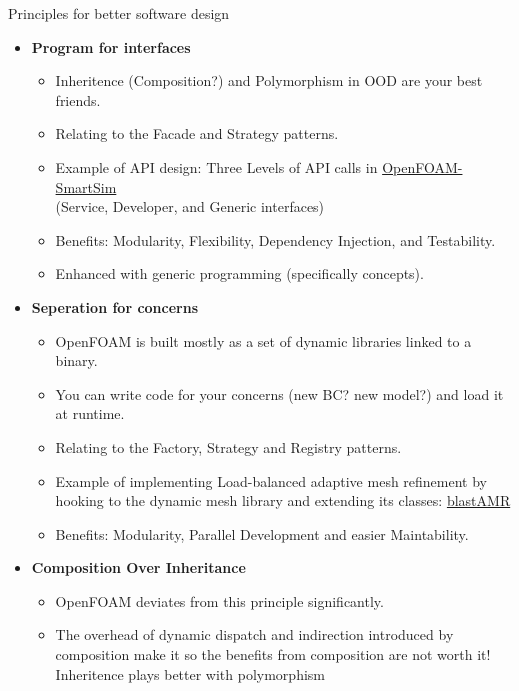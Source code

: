 \begin{frame}{Principles for better software design}

\begin{itemize}
    \item \textbf{Program for interfaces}
    \begin{itemize}
        \item Inheritence (Composition?) and Polymorphism in OOD are your best friends.
        \item Relating to the Facade and Strategy patterns.
        \item Example of API design: Three Levels of API calls in
            \href{https://github.com/OFDataCommittee/openfoam-smartsim/blob/main/docs.md}{OpenFOAM-SmartSim}
            \\(Service, Developer, and Generic interfaces)
        \item Benefits: Modularity, Flexibility, Dependency Injection, and Testability.
        \item Enhanced with generic programming (specifically concepts).
    \end{itemize}
    \pagebreak
    \item \textbf{Seperation for concerns}
    \begin{itemize}
        \item OpenFOAM is built mostly as a set of dynamic libraries linked to a binary.
        \item You can write code for your concerns (new BC? new model?) and load it at runtime.
        \item Relating to the Factory, Strategy and Registry patterns.
        \item Example of implementing Load-balanced adaptive mesh refinement by hooking to the
            dynamic mesh library and extending its classes:
            \href{https://github.com/STFS-TUDa/blastAMR}{blastAMR}
        \item Benefits: Modularity, Parallel Development and easier Maintability.
    \end{itemize}
    \pagebreak
    \item \textbf{Composition Over Inheritance}
    \begin{itemize}
        \item OpenFOAM deviates from this principle significantly.
        \item The overhead of dynamic dispatch and indirection introduced by composition make it so
        the benefits from composition are not worth it! Inheritence plays better with polymorphism

\end{itemize}
\end{itemize}
\end{frame}
